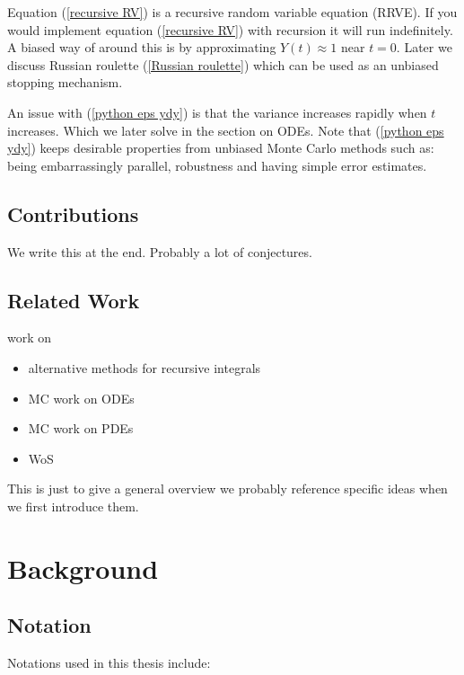 \documentclass[a4paper,12pt]{article}
\begin{document}
Equation (\ref{recursive RV}) is a recursive random variable equation (RRVE). If you would implement equation
(\ref{recursive RV}) with recursion it will run indefinitely. A biased way of around this is by approximating
$Y(t) \approx 1$ near $t = 0$. Later we discuss Russian roulette (\ref{Russian roulette}) which
can be used as an unbiased stopping mechanism.

\vspace*{0.2cm}

\begin{pythonn} \label{python eps ydy}
\end{pythonn}

An issue with (\ref{python eps ydy}) is that the variance increases rapidly when $t$ increases. Which we
later solve in the section on ODEs. Note that (\ref{python eps ydy}) keeps desirable properties
from unbiased Monte Carlo methods such as: being embarrassingly parallel,
robustness and having simple error estimates.


\subsection{Contributions}
We write this at the end. Probably a lot of conjectures.

\subsection{Related Work}
work on
\begin{itemize}
    \item alternative methods for recursive integrals
    \item MC work on ODEs
    \item MC work on PDEs
    \item WoS
\end{itemize}
This is just to give a general overview we probably reference specific ideas when we first introduce them.

\section{Background}

\subsection{Notation}
Notations used in this thesis include:
\end{document}
